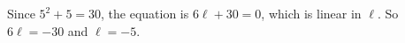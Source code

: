 Since $5^2+5=30$, the equation is $6\ell+30=0$, which is linear in $\ell$. So $6\ell=-30$ and $\boxed{\ell=-5}$.

